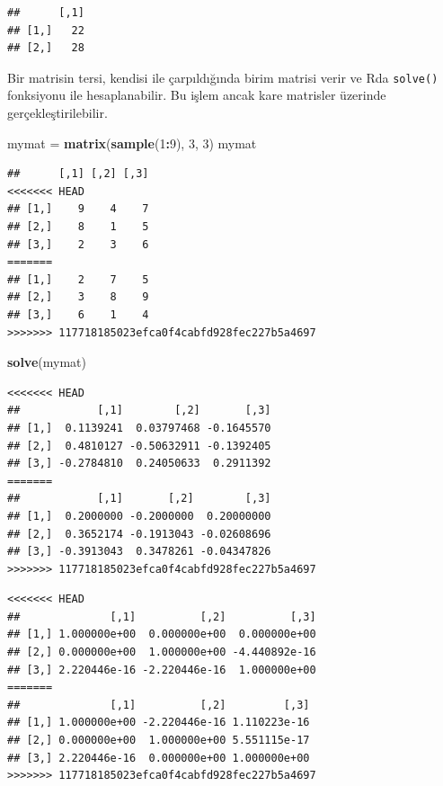 \documentclass[]{book}
\newenvironment{Shaded}{\begin{snugshade}}{\end{snugshade}}
\newcommand{\DecValTok}[1]{\textcolor[rgb]{0.00,0.00,0.81}{#1}}
\newcommand{\KeywordTok}[1]{\textcolor[rgb]{0.13,0.29,0.53}{\textbf{#1}}}
\newcommand{\NormalTok}[1]{#1}
\newcommand{\OperatorTok}[1]{\textcolor[rgb]{0.81,0.36,0.00}{\textbf{#1}}}
\newcommand{\StringTok}[1]{\textcolor[rgb]{0.31,0.60,0.02}{#1}}
\begin{document}
\begin{verbatim}
##      [,1]
## [1,]   22
## [2,]   28
\end{verbatim}

Bir matrisin tersi, kendisi ile çarpıldığında birim matrisi verir ve Rda
\texttt{solve()} fonksiyonu ile hesaplanabilir. Bu işlem ancak kare
matrisler üzerinde gerçekleştirilebilir.

\begin{Shaded}
\begin{Highlighting}[]
\NormalTok{mymat =}\StringTok{ }\KeywordTok{matrix}\NormalTok{(}\KeywordTok{sample}\NormalTok{(}\DecValTok{1}\OperatorTok{:}\DecValTok{9}\NormalTok{), }\DecValTok{3}\NormalTok{, }\DecValTok{3}\NormalTok{)}
\NormalTok{mymat}
\end{Highlighting}
\end{Shaded}

\begin{verbatim}
##      [,1] [,2] [,3]
<<<<<<< HEAD
## [1,]    9    4    7
## [2,]    8    1    5
## [3,]    2    3    6
=======
## [1,]    2    7    5
## [2,]    3    8    9
## [3,]    6    1    4
>>>>>>> 117718185023efca0f4cabfd928fec227b5a4697
\end{verbatim}

\begin{Shaded}
\begin{Highlighting}[]
\KeywordTok{solve}\NormalTok{(mymat)}
\end{Highlighting}
\end{Shaded}

\begin{verbatim}
<<<<<<< HEAD
##            [,1]        [,2]       [,3]
## [1,]  0.1139241  0.03797468 -0.1645570
## [2,]  0.4810127 -0.50632911 -0.1392405
## [3,] -0.2784810  0.24050633  0.2911392
=======
##            [,1]       [,2]        [,3]
## [1,]  0.2000000 -0.2000000  0.20000000
## [2,]  0.3652174 -0.1913043 -0.02608696
## [3,] -0.3913043  0.3478261 -0.04347826
>>>>>>> 117718185023efca0f4cabfd928fec227b5a4697
\end{verbatim}

\begin{Shaded}
\end{Shaded}

\begin{verbatim}
<<<<<<< HEAD
##              [,1]          [,2]          [,3]
## [1,] 1.000000e+00  0.000000e+00  0.000000e+00
## [2,] 0.000000e+00  1.000000e+00 -4.440892e-16
## [3,] 2.220446e-16 -2.220446e-16  1.000000e+00
=======
##              [,1]          [,2]         [,3]
## [1,] 1.000000e+00 -2.220446e-16 1.110223e-16
## [2,] 0.000000e+00  1.000000e+00 5.551115e-17
## [3,] 2.220446e-16  0.000000e+00 1.000000e+00
>>>>>>> 117718185023efca0f4cabfd928fec227b5a4697
\end{verbatim}
\end{document}
